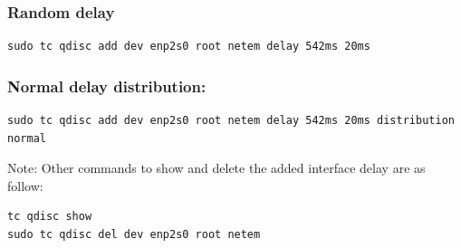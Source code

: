 \subsubsection{Random delay}
	\begin{lstlisting}
sudo tc qdisc add dev enp2s0 root netem delay 542ms 20ms
\end{lstlisting}
\subsubsection{Normal delay distribution:}
	\begin{lstlisting}
sudo tc qdisc add dev enp2s0 root netem delay 542ms 20ms distribution normal
\end{lstlisting}

\noindent Note: Other commands to show and delete the added interface delay are as follow:
\begin{lstlisting}
tc qdisc show
sudo tc qdisc del dev enp2s0 root netem
\end{lstlisting}

\newpage
